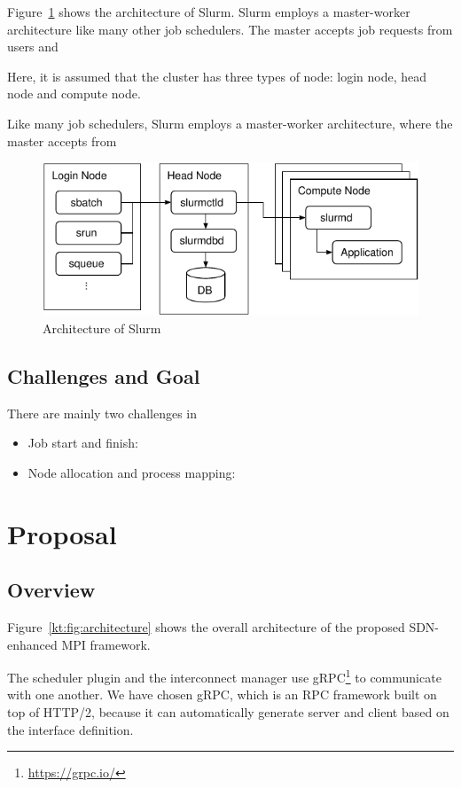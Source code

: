 \documentclass[graybox]{svmult}
\begin{document}
Figure~\ref{kt:fig:slurm} shows the architecture of Slurm. Slurm employs a
master-worker architecture like many other job schedulers. The master accepts
job requests from users and

Here, it is assumed
that the cluster has three types of node: login node, head node and compute
node.

Like many job
schedulers, Slurm employs a master-worker architecture, where the master
accepts from

\begin{figure}
    \centering
    \includegraphics{slurm}
    \caption{Architecture of Slurm}%
    \label{kt:fig:slurm}
\end{figure}

\subsection{Challenges and Goal}

There are mainly two challenges in

\begin{itemize}
    \item Job start and finish:
    \item Node allocation and process mapping:
\end{itemize}


\section{Proposal}\label{kt:sec:iii}

\subsection{Overview}

Figure~\ref{kt:fig:architecture} shows the overall architecture of the
proposed SDN-enhanced MPI framework.

The scheduler plugin and the interconnect manager use
gRPC\footnote{\url{https://grpc.io/}} to communicate with one another. We have
chosen gRPC, which is an RPC framework built on top of HTTP/2, because it
can automatically generate server and client based on the interface
definition.
\end{document}
